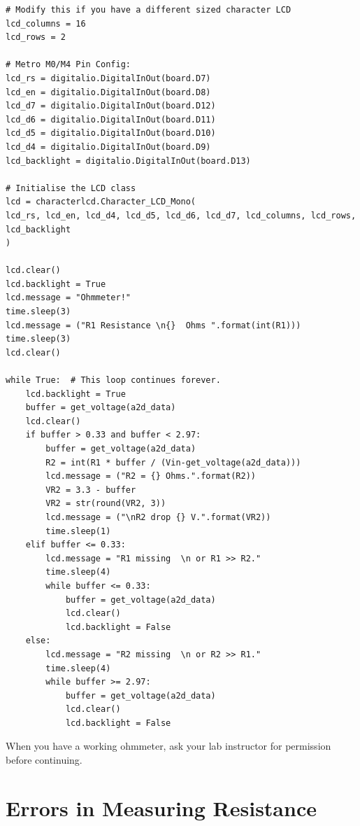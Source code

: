 \documentclass[]{article}
\begin{document}
\begin{verbatim}
# Modify this if you have a different sized character LCD
lcd_columns = 16
lcd_rows = 2

# Metro M0/M4 Pin Config:
lcd_rs = digitalio.DigitalInOut(board.D7)
lcd_en = digitalio.DigitalInOut(board.D8)
lcd_d7 = digitalio.DigitalInOut(board.D12)
lcd_d6 = digitalio.DigitalInOut(board.D11)
lcd_d5 = digitalio.DigitalInOut(board.D10)
lcd_d4 = digitalio.DigitalInOut(board.D9)
lcd_backlight = digitalio.DigitalInOut(board.D13)

# Initialise the LCD class
lcd = characterlcd.Character_LCD_Mono(
lcd_rs, lcd_en, lcd_d4, lcd_d5, lcd_d6, lcd_d7, lcd_columns, lcd_rows, lcd_backlight
)

lcd.clear()
lcd.backlight = True
lcd.message = "Ohmmeter!"  
time.sleep(3)
lcd.message = ("R1 Resistance \n{}  Ohms ".format(int(R1)))
time.sleep(3)
lcd.clear()

while True:  # This loop continues forever.
	lcd.backlight = True
	buffer = get_voltage(a2d_data)
	lcd.clear()
	if buffer > 0.33 and buffer < 2.97:
		buffer = get_voltage(a2d_data)
		R2 = int(R1 * buffer / (Vin-get_voltage(a2d_data)))
		lcd.message = ("R2 = {} Ohms.".format(R2))
		VR2 = 3.3 - buffer
		VR2 = str(round(VR2, 3))
		lcd.message = ("\nR2 drop {} V.".format(VR2))
		time.sleep(1)
	elif buffer <= 0.33:
		lcd.message = "R1 missing  \n or R1 >> R2."
		time.sleep(4)
		while buffer <= 0.33:
			buffer = get_voltage(a2d_data)
			lcd.clear()
			lcd.backlight = False
	else:
		lcd.message = "R2 missing  \n or R2 >> R1."
		time.sleep(4)
		while buffer >= 2.97:
			buffer = get_voltage(a2d_data)
			lcd.clear()
			lcd.backlight = False

\end{verbatim}

When you have a working ohmmeter, ask your lab instructor for permission before continuing.





	\section{Errors in Measuring Resistance}
\end{document}
